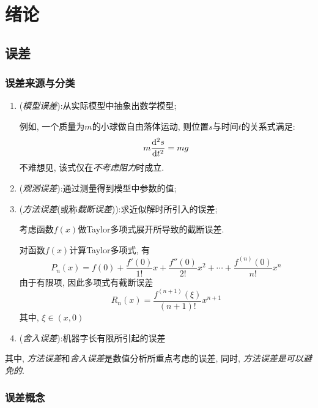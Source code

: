 \chapter{绪论}
\section{误差}

\subsection{误差来源与分类}
\begin{enumerate}
    \item (\emph{模型误差}):从实际模型中抽象出数学模型;
    
    例如, 一个质量为$m$的小球做自由落体运动, 则位置$s$与时间$t$的关系式满足:
    \begin{equation*}
        m\dv[2]{s}{t}=mg
    \end{equation*}
    不难想见, 该式仅在\emph{不考虑阻力}时成立.

    \item (\emph{观测误差}):通过测量得到模型中参数的值;
    \item (\emph{方法误差}(或称\emph{截断误差})):求近似解时所引入的误差;
    \begin{example}
        考虑函数$f(x)$做Taylor多项式展开所导致的截断误差.
    \end{example}
    \begin{solution}
        对函数$f(x)$计算Taylor多项式, 有
        \begin{equation*}
            P_n(x)=f(0)+\frac{f'(0)}{1!}x+\frac{f''(0)}{2!}x^2+\cdots+\frac{f^{(n)}(0)}{n!}x^n
        \end{equation*}
        由于有限项, 因此多项式有截断误差
        \begin{equation*}
            R_n(x)=\frac{f^{(n+1)}(\xi)}{(n+1)!}x^{n+1}
        \end{equation*}
        其中, $\xi\in(x,0)$
    \end{solution}

    \item (\emph{舍入误差}):机器字长有限所引起的误差 
\end{enumerate}

其中, \emph{方法误差}和\emph{舍入误差}是数值分析所重点考虑的误差, 同时, \emph{方法误差是可以避免的}.

\subsection{误差概念}
